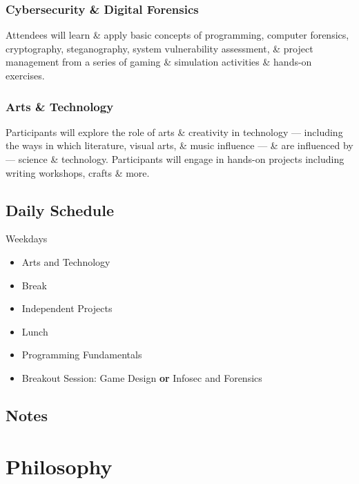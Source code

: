 \documentclass[letterpaper,10pt,english]{sphinxmanual}
\begin{document}
\subsection{Cybersecurity \& Digital Forensics}
\label{description:cybersecurity-digital-forensics}
Attendees will learn \& apply basic concepts of programming, computer forensics, cryptography, steganography, system vulnerability assessment, \& project management from a series of gaming \& simulation activities \& hands-on exercises.


\subsection{Arts \& Technology}
\label{description:arts-technology}
Participants will explore the role of arts \& creativity in technology — including the ways in which literature, visual arts, \& music influence — \& are influenced by — science \& technology. Participants will engage in hands-on projects including writing workshops, crafts \& more.


\section{Daily Schedule}
\label{description:daily-schedule}
Weekdays
\begin{itemize}
\item {} 
Arts and Technology

\item {} 
Break

\item {} 
Independent Projects

\item {} 
Lunch

\item {} 
Programming Fundamentals

\item {} 
Breakout Session: Game Design \textbf{or} Infosec and Forensics

\end{itemize}


\section{Notes}
\label{description:notes}

\chapter{Philosophy}
\label{philosophy::doc}\label{philosophy:philosophy}\label{philosophy:index-0}
\end{document}
